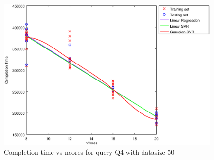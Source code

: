 
\begin {figure}[hbtp]
\centering
\includegraphics[width=\textwidth]{output/Q4_50_ONLY_NCORES/plot_Q4_50_bestmodels.eps}
\caption{Completion time vs ncores for query Q4 with datasize 50}
\label{fig:all_linear_Q4_50}
\end {figure}
